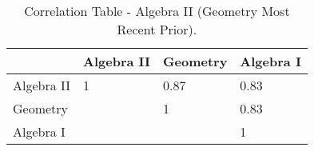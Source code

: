 \begin{table}[!tbp]
\caption{Correlation Table - Algebra II (Geometry Most Recent Prior).\label{}} 
\begin{center}
\begin{tabular}{llll}
\hline\hline
\multicolumn{1}{l}{}&\multicolumn{1}{c}{Algebra II}&\multicolumn{1}{c}{Geometry}&\multicolumn{1}{c}{Algebra I}\tabularnewline
\hline
Algebra II&1&0.87&0.83\tabularnewline
Geometry&&1&0.83\tabularnewline
Algebra I&&&1\tabularnewline
\hline
\end{tabular}\end{center}
\end{table}
